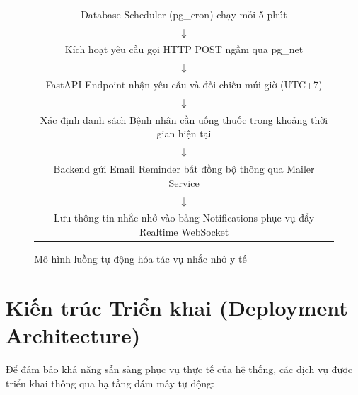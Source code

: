 \documentclass[12pt,a4paper]{report}
\begin{document}
\begin{figure}[htbp]
  \centering
  \begin{infobox}[title=Luồng tự động hóa nhắc nhở uống thuốc]
  \begin{center}
  \ttfamily
  \begin{tabular}{c}
    Database Scheduler (pg\_cron) chạy mỗi 5 phút \\
    $\downarrow$ \\
    Kích hoạt yêu cầu gọi HTTP POST ngầm qua pg\_net \\
    $\downarrow$ \\
    FastAPI Endpoint nhận yêu cầu và đối chiếu múi giờ (UTC+7) \\
    $\downarrow$ \\
    Xác định danh sách Bệnh nhân cần uống thuốc trong khoảng thời gian hiện tại \\
    $\downarrow$ \\
    Backend gửi Email Reminder bất đồng bộ thông qua Mailer Service \\
    $\downarrow$ \\
    Lưu thông tin nhắc nhở vào bảng Notifications phục vụ đẩy Realtime WebSocket \\
  \end{tabular}
  \end{center}
  \end{infobox}
  \caption{Mô hình luồng tự động hóa tác vụ nhắc nhở y tế}
  \label{fig:automations_flow}
\end{figure}

\section{Kiến trúc Triển khai (Deployment Architecture)}

Để đảm bảo khả năng sẵn sàng phục vụ thực tế của hệ thống, các dịch vụ được triển khai thông qua hạ tầng đám mây tự động:
\end{document}
